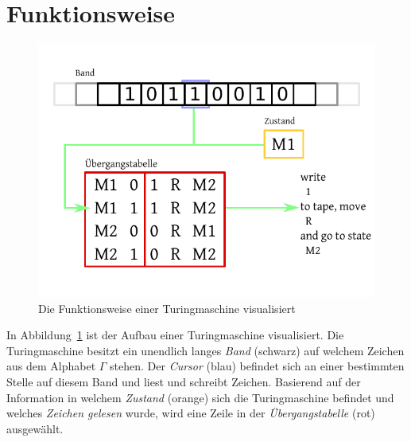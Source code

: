 \section{Funktionsweise}
%
\begin{figure}[ht]
 \begin{center}
  \includegraphics{img/turingmachine_visualization.pdf}
  \caption{Die Funktionsweise einer Turingmaschine visualisiert}
  \label{fig:tm_vis}
 \end{center}
\end{figure}
%
In Abbildung~\ref{fig:tm_vis} ist der Aufbau einer Turingmaschine visualisiert. Die Turingmaschine besitzt ein unendlich langes \emph{Band} (schwarz) auf welchem Zeichen aus dem Alphabet $\Gamma$ stehen. Der \emph{Cursor} (blau) befindet sich an einer bestimmten Stelle auf diesem Band und liest und schreibt Zeichen. Basierend auf der Information in welchem \emph{Zustand} (orange) sich die Turingmaschine befindet und welches \emph{Zeichen gelesen} wurde, wird eine Zeile in der \emph{Übergangstabelle} (rot) ausgewählt.

